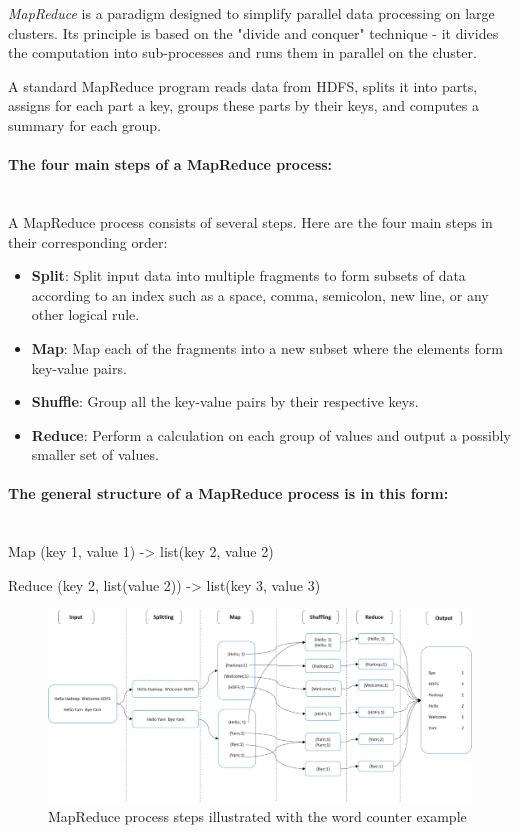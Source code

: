 \documentclass[12pt,english]{book}
\begin{document}
\emph{MapReduce} is a paradigm designed to simplify parallel data processing on large clusters.
Its principle is based on the "divide and conquer" technique - it divides the computation into sub-processes and runs them in parallel on the cluster.

A standard MapReduce program reads data from HDFS, splits it into parts, assigns for each part a key, groups these parts by their keys, and computes a summary for each group.


\paragraph{The four main steps of a MapReduce process:}\mbox{}\\


A MapReduce process consists of several steps. Here are the four main steps in their corresponding order:
 
\begin{itemize}
\item
\textbf{Split}: Split input data into multiple fragments to form subsets of data according to an index such as a space, comma, semicolon, new line, or any other logical rule.
\item
\textbf{Map}: Map each of the fragments into a new subset where the elements form key-value pairs.
\item
\textbf{Shuffle}: Group all the key-value pairs by their respective keys.
\item
\textbf{Reduce}: Perform a calculation on each group of values and output a possibly smaller set of values.
\end{itemize}


\paragraph{The general structure of a MapReduce process is in this form:}\mbox{}\\


Map		(key 1, value 1)		->		list(key 2, value 2)

Reduce	(key 2, list(value 2))	->		list(key 3, value 3)

\begin{figure}[ht]
	\centering
	\includegraphics[width=\linewidth]{mapReduceSchema}
	\caption{MapReduce process steps illustrated with the word counter example}
\label{fig:wordCountExample}
\end{figure}
\end{document}
